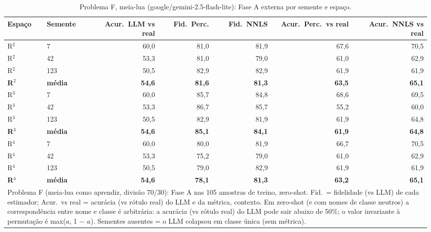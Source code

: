 \begin{table}[htbp]
\centering
\small
\caption{Problema F, meia-lua (google/gemini-2.5-flash-lite): Fase A externa por semente e espaço.}
\label{tab:bloco2_F_meialua_faseA_R2_R3_R4_flashlite}
\begin{tabular}{llrrrrr}
\toprule
Espaço & Semente & Acur.\ LLM vs real & Fid.\ Perc. & Fid.\ NNLS & Acur.\ Perc.\ vs real & Acur.\ NNLS vs real \\
\midrule
R$^2$ & 7 & 60,0 & 81,0 & 81,9 & 67,6 & 70,5 \\
R$^2$ & 42 & 53,3 & 81,0 & 79,0 & 61,0 & 62,9 \\
R$^2$ & 123 & 50,5 & 82,9 & 82,9 & 61,9 & 61,9 \\
\textbf{R$^2$} & \textbf{média} & \textbf{54,6} & \textbf{81,6} & \textbf{81,3} & \textbf{63,5} & \textbf{65,1} \\
\midrule
R$^3$ & 7 & 60,0 & 85,7 & 84,8 & 68,6 & 69,5 \\
R$^3$ & 42 & 53,3 & 86,7 & 85,7 & 55,2 & 60,0 \\
R$^3$ & 123 & 50,5 & 82,9 & 81,9 & 61,9 & 64,8 \\
\textbf{R$^3$} & \textbf{média} & \textbf{54,6} & \textbf{85,1} & \textbf{84,1} & \textbf{61,9} & \textbf{64,8} \\
\midrule
R$^4$ & 7 & 60,0 & 80,0 & 81,9 & 66,7 & 70,5 \\
R$^4$ & 42 & 53,3 & 75,2 & 79,0 & 61,0 & 62,9 \\
R$^4$ & 123 & 50,5 & 79,0 & 82,9 & 61,9 & 61,9 \\
\textbf{R$^4$} & \textbf{média} & \textbf{54,6} & \textbf{78,1} & \textbf{81,3} & \textbf{63,2} & \textbf{65,1} \\
\bottomrule
\multicolumn{7}{p{0.95\linewidth}}{\footnotesize Problema F (meia-lua como aprendiz, divisão 70/30): Fase A nas 105 amostras de treino, zero-shot. Fid.\ = fidelidade (vs LLM) de cada estimador; Acur.\ vs real = acurácia (vs rótulo real) do LLM e da métrica, contexto. Em zero-shot (e com nomes de classe neutros) a correspondência entre nome e classe é arbitrária: a acurácia (vs rótulo real) do LLM pode sair abaixo de 50\%; o valor invariante à permutação é max($a$, 1 $-$ $a$). Sementes ausentes = o LLM colapsou em classe única (sem métrica).} \\
\end{tabular}
\end{table}
